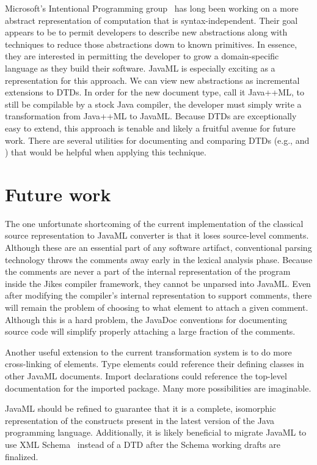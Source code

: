 \documentclass{article}
\begin{document}
Microsoft's Intentional Programming group~\cite{Simonyi96} has
long been working on a more abstract representation of computation that
is syntax-independent.  Their goal appears to be to permit developers to
describe new abstractions along with techniques to reduce those
abstractions down to known primitives.  In essence, they are interested
in permitting the developer to grow a domain-specific language as they
build their software.  JavaML is especially exciting as a representation
for this approach.  We can view new abstractions as incremental
extensions to DTDs.  In order for the new document type, call it Java++ML, to
still be compilable by a stock Java compiler, the developer must simply
write a transformation from Java++ML to JavaML.  Because DTDs are
exceptionally easy to extend, this approach is tenable and likely a
fruitful avenue for future work.  There are several utilities for
documenting and comparing DTDs (e.g.,  and
) that would be helpful when applying this
technique.


\section{Future work}
\label{sec-future}

The one unfortunate shortcoming of the current implementation of the
classical source representation to JavaML converter
is that it loses source-level comments.  Although these
are an essential part of any software artifact, conventional parsing
technology throws the comments away early in the lexical analysis phase.
Because the comments are never a part of the internal representation of
the program inside the Jikes compiler framework, they cannot be unparsed
into JavaML.  Even after modifying the compiler's internal 
representation to support
comments, there will remain the problem of choosing to what element to
attach a given comment.  Although this is a hard problem, the JavaDoc
conventions for documenting source code will simplify properly attaching
a large fraction of the comments.

Another useful extension to the current transformation system is to do
more cross-linking of elements.  Type elements could reference their
defining classes in other JavaML documents.  Import declarations could
reference the top-level documentation for the imported package.  Many
more possibilities are imaginable.

JavaML should be refined to guarantee that it is a complete, isomorphic
representation of the constructs present in the latest version of the
Java programming language.  Additionally, it is likely beneficial to
migrate JavaML to use XML Schema~\cite{XMLSchema1,XMLSchema2}
instead of a DTD after the Schema working drafts are finalized.
\end{document}

